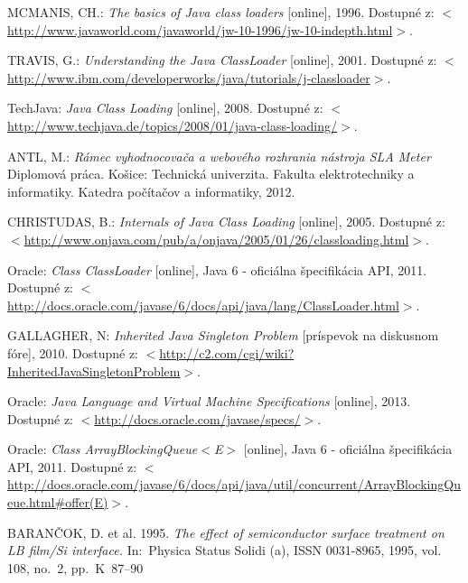 \begin{thebibliography}{999}
MCMANIS, CH.: \emph{The basics of Java class loaders} [online], 1996. Dostupné 
z: $<$\url{http://www.javaworld.com/javaworld/jw-10-1996/jw-10-indepth.html}$>$.

TRAVIS, G.: \emph{Understanding the Java ClassLoader} [online], 2001. Dostupné 
z: $<$\url{http://www.ibm.com/developerworks/java/tutorials/j-classloader}$>$.

TechJava: \emph{Java Class Loading} [online], 2008. Dostupné 
z: $<$\url{http://www.techjava.de/topics/2008/01/java-class-loading/}$>$.

ANTL, M.: \emph{Rámec vyhodnocovača a webového rozhrania nástroja SLA Meter} 
Diplomová práca. Košice: Technická univerzita. Fakulta elektrotechniky a informatiky. 
Katedra počítačov a informatiky, 2012.

CHRISTUDAS, B.: \emph{Internals of Java Class Loading} [online], 2005. Dostupné 
z: $<$\url{http://www.onjava.com/pub/a/onjava/2005/01/26/classloading.html}$>$.

Oracle: \emph{Class ClassLoader} [online], Java 6 - oficiálna špecifikácia API, 2011. 
Dostupné z: $<$\url{http://docs.oracle.com/javase/6/docs/api/java/lang/ClassLoader.html}$>$.

GALLAGHER, N: \emph{Inherited Java Singleton Problem} [príspevok na diskusnom fóre], 2010. 
Dostupné z: $<$\url{http://c2.com/cgi/wiki?InheritedJavaSingletonProblem}$>$.

Oracle: \emph{Java Language and Virtual Machine Specifications} [online], 2013. 
Dostupné z: $<$\url{http://docs.oracle.com/javase/specs/}$>$.

Oracle: \emph{Class ArrayBlockingQueue$<$E$>$} [online], Java 6 - oficiálna špecifikácia API, 2011. 
Dostupné z: 
$<$\url{http://docs.oracle.com/javase/6/docs/api/java/util/concurrent/ArrayBlockingQueue.html#offer(E)}$>$.





BARANČOK, D. et al. 1995. \emph{The effect of semiconductor surface
treatment on LB film/Si interface.} In:~Physica Status Solidi (a), 
ISSN 0031-8965, 1995, vol. 108, no.~2, \mbox{pp. K~87--90}


\end{thebibliography}
